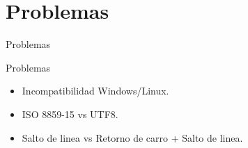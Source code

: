\section{Problemas}
\begin{frame}{Problemas}
 \begin{block}{Problemas}
  \begin{itemize}
   \item Incompatibilidad Windows/Linux.
   \item ISO 8859-15 vs UTF8.
   \item Salto de linea vs Retorno de carro + Salto de linea.
  \end{itemize}
 \end{block}
\end{frame}
